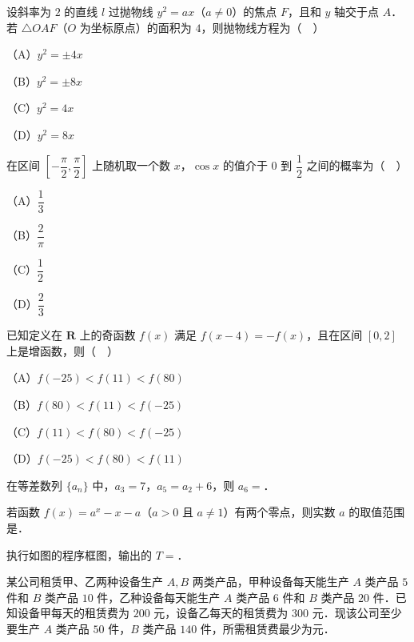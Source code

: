 \begin{question}
设斜率为 $2$ 的直线 $l$ 过抛物线 $y^2=ax$（$a\neq0$）的焦点 $F$，且和 $y$ 轴交于点 $A$．若 $\triangle OAF$（$O$ 为坐标原点）的面积为 $4$，则抛物线方程为（　）

（A）$y^2=\pm4x$

（B）$y^2=\pm8x$

（C）$y^2=4x$

（D）$y^2=8x$

\end{question}
\begin{question}
在区间 $\left[-\dfrac{\pi}{2},\dfrac{\pi}{2}\right]$ 上随机取一个数 $x$，$\cos x$ 的值介于 $0$ 到 $\dfrac12$ 之间的概率为（　）

（A）$\dfrac13$

（B）$\dfrac2\pi$

（C）$\dfrac12$

（D）$\dfrac23$

\end{question}
\begin{question}
已知定义在 $\mathbf R$ 上的奇函数 $f(x)$ 满足 $f(x-4)=-f(x)$，且在区间 $[0,2]$ 上是增函数，则（　）

（A）$f(-25)<f(11)<f(80)$

（B）$f(80)<f(11)<f(-25)$

（C）$f(11)<f(80)<f(-25)$

（D）$f(-25)<f(80)<f(11)$

\end{question}

\begin{question}
在等差数列 $\{a_n\}$ 中，$a_3=7$，$a_5=a_2+6$，则 $a_6=$\gkblank{}．

\end{question}
\begin{question}
若函数 $f(x)=a^x-x-a$（$a>0$ 且 $a\neq1$）有两个零点，则实数 $a$ 的取值范围是\gkblank{}．

\Needspace{0.4\textheight}
\end{question}
\begin{question}
执行如图的程序框图，输出的 $T=$\gkblank{}．
\nopagebreak[4]
\begin{center}\end{center}
\nopagebreak[4]
\end{question}
\begin{question}
某公司租赁甲、乙两种设备生产 $A,B$ 两类产品，甲种设备每天能生产 $A$ 类产品 $5$ 件和 $B$ 类产品 $10$ 件，乙种设备每天能生产 $A$ 类产品 $6$ 件和 $B$ 类产品 $20$ 件．已知设备甲每天的租赁费为 $200$ 元，设备乙每天的租赁费为 $300$ 元．现该公司至少要生产 $A$ 类产品 $50$ 件，$B$ 类产品 $140$ 件，所需租赁费最少为\gkblank{}元．

\end{question}

